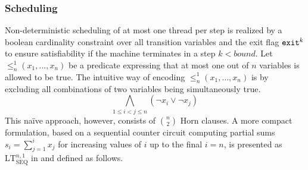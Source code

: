 \subsubsection*{Scheduling}

\newcommand{\CardLt}{\leq^1_n(x_1, \ldots, x_n)}
\newcommand{\CardLtSeq}{\text{LT}^{n, 1}_{\text{SEQ}}}

\newcommand{\ITE}{\texttt{ite}}
\newcommand{\ITEindent}{\;\;\;\;\;\;\;}

Non-deterministic scheduling of at most one thread per step is realized by a boolean cardinality constraint over all transition variables and the exit flag $\texttt{exit}^k$ to ensure satisfiability if the machine terminates in a step $k < bound$.
Let $\CardLt$ be a predicate expressing that at most one out of $n$ variables is allowed to be true.
The intuitive way of encoding $\CardLt$ is by excluding all combinations of two variables being simultaneously true.
\[
  \bigwedge_{1 \leq i < j \leq n} (\neg x_i \lor \neg x_j)
\]
This na\"ive approach, however, consists of $\binom{n}{2}$ Horn clauses.
A more compact formulation, based on a sequential counter circuit computing partial sums $s_i = \sum^i_{j = 1} x_j$ for increasing values of $i$ up to the final $i = n$, is presented as $\CardLtSeq$ in \cite{ref:Sinz} and defined as follows.
